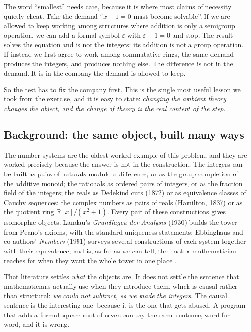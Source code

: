 \documentclass[aps,prd,preprint,superscriptaddress,amsmath,amssymb]{revtex4-2}
\begin{document}
The word ``smallest'' needs care, because it is where most claims of necessity
quietly cheat.  Take the demand ``$x+1=0$ must become solvable''.  If we are
allowed to keep working among structures where addition is only a semigroup
operation, we can add a formal symbol $\varepsilon$ with $\varepsilon+1=0$ and
stop.  The result solves the equation and is not the integers: its addition is
not a group operation.  If instead we first agree to work among commutative rings,
the same demand produces the integers, and produces nothing else.  The difference
is not in the demand.  It is in the company the demand is allowed to keep.

So the test has to fix the company first.  This is the single most useful lesson
we took from the exercise, and it is easy to state: \emph{changing the ambient
theory changes the object, and the change of theory is the real content of the
step.}

\subsection*{Background: the same object, built many ways}

The number systems are the oldest worked example of this problem, and they are
worked precisely because the answer is not in the construction.  The integers can
be built as pairs of naturals modulo a difference, or as the group completion of
the additive monoid; the rationals as ordered pairs of integers, or as the
fraction field of the integers; the reals as Dedekind cuts (1872) or as
equivalence classes of Cauchy sequences; the complex numbers as pairs of reals
(Hamilton, 1837) or as the quotient ring $\mathbb{R}[x]/(x^2+1)$.  Every pair of
these constructions gives isomorphic objects.  Landau's \emph{Grundlagen der
Analysis} (1930) builds the tower from Peano's axioms, with the standard
uniqueness statements; Ebbinghaus and co-authors' \emph{Numbers} (1991)
surveys several constructions of each system together with their equivalence,
and is, as far as we can tell, the book a mathematician reaches for when they
want the whole tower in one place \cite{landau,dedekind,ebb}.

That literature settles \emph{what} the objects are.  It does not settle the
sentence that mathematicians actually use when they introduce them, which is
causal rather than structural: \emph{we could not subtract, so we made the
integers}.  The causal sentence is the interesting one, because it is the one
that gets abused.  A program that adds a formal square root of seven can say the
same sentence, word for word, and it is wrong.
\end{document}

